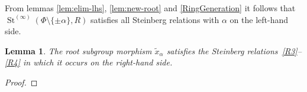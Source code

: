 \documentclass{article}
\numberwithin{equation}{section}
\newtheorem{lemma}{Lemma} \numberwithin{lemma}{section}
\theoremstyle{definition}
\theoremstyle{remark}
\DeclareMathOperator\St{St}
\newcommand{\rF}{\mathsf{F}}
\begin{document}
From lemmas \ref{lem:elim-lhs}, \ref{lem:new-root} and \ref{RingGeneration} it follows that \(\St^{(\infty)}(\Phi \setminus \{\pm \alpha\}, R)\) satisfies all Steinberg relations with \(\alpha\) on the left-hand side.

\begin{lemma} \label{lem:elim-rhs}
 The root subgroup morphism $\widetilde{x}_\alpha$ satisfies the Steinberg relations~\eqref{R3}--\eqref{R4} in which it occurs on the right-hand side.
\end{lemma}
\begin{proof}



\end{proof}
\end{document}
